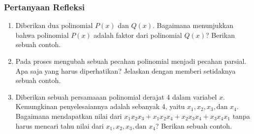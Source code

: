 \documentclass[11pt]{beamer}
\newcounter{saveenumi}
\newcommand{\conti}{\setcounter{enumi}{\value{saveenumi}}}
\begin{document}
	\begin{frame}
		\frametitle{Pertanyaan Refleksi}
		\begin{enumerate}
			\conti
			
			\item Diberikan dua polinomial $P(x)$ dan $Q(x)$. Bagaimana menunjukkan bahwa polinomial $P(x)$ adalah faktor dari polinomial $Q(x)$? Berikan sebuah contoh.
			
			\item Pada proses mengubah sebuah pecahan polinomial menjadi pecahan parsial. Apa saja yang harus diperhatikan? Jelaskan dengan memberi setidaknya sebuah contoh.
			
			\item Diberikan sebuah persamaaan polinomial derajat 4 dalam variabel $x$. Kemungkinan penyelesaiannya adalah sebanyak 4, yaitu $x_1,x_2,x_3,\text{dan }x_4$. Bagaimana mendapatkan nilai dari $x_1x_2x_3+x_1x_2x_4+x_2x_3x_4+x_3x_4x_1$ tanpa harus mencari tahu nilai dari $x_1,x_2,x_3,\text{dan }x_4$? Berikan sebuah contoh.
			
		\end{enumerate}
		
	\end{frame}
	
	
\end{document}
